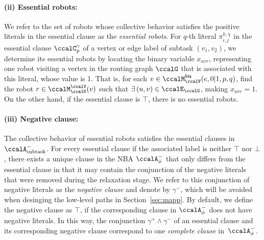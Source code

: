\documentclass[Afour,sageh,times]{sagej}
\newcommand{\auto}[1]{\ccalA_{\text{#1}}}
\newcommand{\autop}{\ccalA_{\phi}}
\renewcommand{\ap}[3]{\mathcal{\pi}_{{#1},{#2}}^{#3}}
\begin{document}
{   \paragraph{(ii) Essential robots:} We refer to the set of robots whose collective behavior satisfies the positive literals in the essential clause as the {\it essential robots}. For $q$-th literal $\ap{i}{j}{k,\chi}$ in the essential clause $\ccalC_p^\gamma$ of a vertex or edge label of subtask $(v_1, v_2)$, we determine its essential robots by locating the binary variable $x_{uvr}$, representing one robot visiting a vertex in the routing graph $\ccalG$ that is associated with this literal, whose value is 1. That is, for each $v\in \ccalM_{\ccalV}^\mathsf{lits} (e, 0|1, p, q)$, find the robot $r\in \ccalM_\ccalK^\ccalV(v)$ such that $\exists\, (u,v)\in\ccalE_\ccalG$, making $x_{uvr}=1$.  On the other hand, if the essential clause is $\top$, there is no essential robots.
   \paragraph{(iii) Negative clause:} The collective behavior of essential robots satisfies the essential clauses in $\auto{subtask}^-$. For every essential clause if the associated label is neither $\top$ nor $\bot$, there exists a unique clause in the NBA $\autop^-$ that only differs from the essential clause in that it may contain the conjunction of the negative literals that were removed during the relaxation stage. We refer to this conjunction of negative literals  as the {\it negative clause} and denote by $\gamma^-$, which will be avoided when desinging the low-level paths in Section~\ref{sec:mapp}.  By default, we  define the negative clause as $\top$, if the corresponding clause in $\autop^-$ does not have negative literals. In this way, the conjunction $\gamma^+ \wedge \gamma^-$ of an essential  clause and its corresponding negative clause correspond to  one {\it complete clause} in~$\autop^-$.

}
\end{document}
